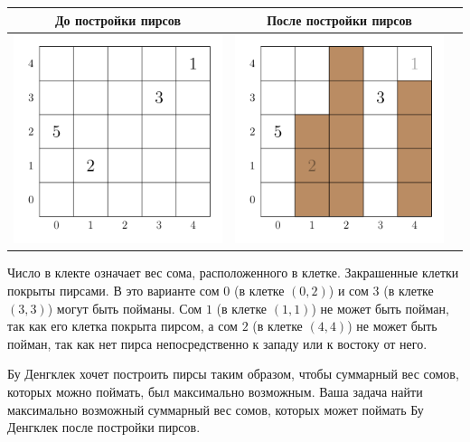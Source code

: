 \begin{center}
\renewcommand{\arraystretch}{1.5}
\begin{tabular}{|c|c|c|}
\hline

До постройки пирсов &  После постройки пирсов \\
\hline
\includegraphics{fish-sample1-pond.png}   & \includegraphics{fish-sample1-pier.png}\\
\hline
\end{tabular}
\end{center}

Число в клекте означает вес сома, расположенного в клетке.
Закрашенные клетки покрыты пирсами.
В это варианте сом $0$ (в клетке $(0, 2)$) и сом $3$ (в клетке $(3, 3)$) могут быть пойманы.
Сом $1$ (в клетке $(1, 1)$) не может быть пойман, так как его клетка покрыта пирсом, а сом $2$ (в клетке $(4, 4)$) не может быть пойман, так как нет пирса непосредственно к западу или к востоку от него.

Бу Денгклек хочет построить пирсы таким образом, чтобы суммарный вес сомов, которых можно поймать, был максимально возможным.
Ваша задача найти максимально возможный суммарный вес сомов, которых может поймать Бу Денгклек после постройки пирсов.


